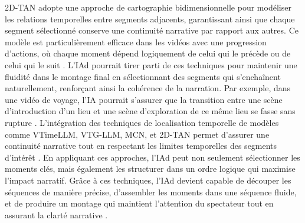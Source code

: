 \documentclass[livre]{udes-genie-these}
\begin{document}
2D-TAN adopte une approche de cartographie bidimensionnelle pour modéliser les relations temporelles entre segments adjacents, garantissant ainsi que chaque segment sélectionné conserve une continuité narrative par rapport aux autres. Ce modèle est particulièrement efficace dans les vidéos avec une progression d'actions, où chaque moment dépend logiquement de celui qui le précède ou de celui qui le suit \cite{prabhu2017_retrieval}\cite{zhang2020_temporal}.
L'IAd pourrait tirer parti de ces techniques pour maintenir une fluidité dans le montage final en sélectionnant des segments qui s'enchaînent naturellement, renforçant ainsi la cohérence de la narration. Par exemple, dans une vidéo de voyage, l'IA pourrait s'assurer que la transition entre une scène d'introduction d'un lieu et une scène d'exploration de ce même lieu se fasse sans rupture \cite{zhang2016_lstm}\cite{zhang2019_memory}.
L'intégration des techniques de localisation temporelle de modèles comme VTimeLLM, VTG-LLM, MCN, et 2D-TAN permet d'assurer une continuité narrative tout en respectant les limites temporelles des segments d'intérêt \cite{han2024_clip}\cite{lei2021_clipbert}\cite{zhang2016_lstm}\cite{prabhu2017_retrieval}. En appliquant ces approches, l'IAd peut non seulement sélectionner les moments clés, mais également les structurer dans un ordre logique qui maximise l'impact narratif.
Grâce à ces techniques, l'IAd devient capable de découper les séquences de manière précise, d'assembler les moments dans une séquence fluide, et de produire un montage qui maintient l'attention du spectateur tout en assurant la clarté narrative \cite{ghosh2019_excl}\cite{zhang2019_memory}.
\end{document}
